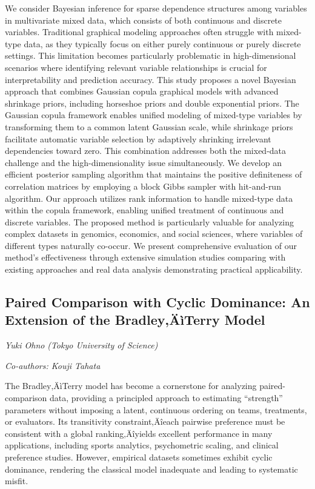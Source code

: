 \documentclass[
]{scrreprt}
\begin{document}
We consider Bayesian inference for sparse dependence structures among
variables in multivariate mixed data, which consists of both continuous
and discrete variables. Traditional graphical modeling approaches often
struggle with mixed-type data, as they typically focus on either purely
continuous or purely discrete settings. This limitation becomes
particularly problematic in high-dimensional scenarios where identifying
relevant variable relationships is crucial for interpretability and
prediction accuracy. This study proposes a novel Bayesian approach that
combines Gaussian copula graphical models with advanced shrinkage
priors, including horseshoe priors and double exponential priors. The
Gaussian copula framework enables unified modeling of mixed-type
variables by transforming them to a common latent Gaussian scale, while
shrinkage priors facilitate automatic variable selection by adaptively
shrinking irrelevant dependencies toward zero. This combination
addresses both the mixed-data challenge and the high-dimensionality
issue simultaneously. We develop an efficient posterior sampling
algorithm that maintains the positive definiteness of correlation
matrices by employing a block Gibbs sampler with hit-and-run algorithm.
Our approach utilizes rank information to handle mixed-type data within
the copula framework, enabling unified treatment of continuous and
discrete variables. The proposed method is particularly valuable for
analyzing complex datasets in genomics, economics, and social sciences,
where variables of different types naturally co-occur. We present
comprehensive evaluation of our method's effectiveness through extensive
simulation studies comparing with existing approaches and real data
analysis demonstrating practical applicability.

\subsection{Paired Comparison with Cyclic Dominance: An Extension of the
Bradley‚ÄìTerry
Model}\label{paired-comparison-with-cyclic-dominance-an-extension-of-the-bradleyuxe4uxecterry-model}

\emph{Yuki Ohno} \emph{(Tokyo University of Science)}

\emph{Co-authors: Kouji Tahata}

\setlength{\parskip}{0.5em}

The Bradley‚ÄìTerry model has become a cornerstone for analyzing
paired-comparison data, providing a principled approach to estimating
``strength'' parameters without imposing a latent, continuous ordering
on teams, treatments, or evaluators. Its transitivity constraint‚Äîeach
pairwise preference must be consistent with a global ranking‚Äîyields
excellent performance in many applications, including sports analytics,
psychometric scaling, and clinical preference studies. However,
empirical datasets sometimes exhibit cyclic dominance, rendering the
classical model inadequate and leading to systematic misfit.
\end{document}
